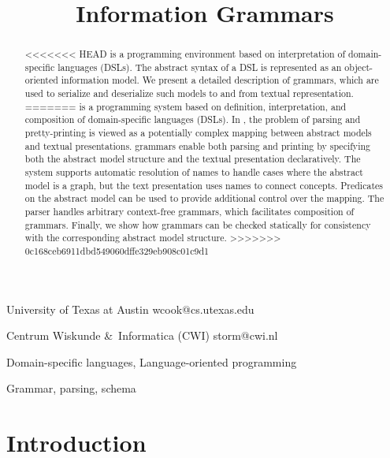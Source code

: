 \documentclass[preprint,10pt]{sigplanconf}
\begin{document}

\title{Information Grammars} %

%
{University of Texas at Austin}%
{wcook@cs.utexas.edu}

%
{Centrum Wiskunde \&\ Informatica (CWI)}%
{storm@cwi.nl}
\maketitle

\begin{abstract}
<<<<<<< HEAD
  \enso is a programming environment based on interpretation of
  domain-specific languages (DSLs). The abstract syntax of a DSL is
  represented as an object-oriented information model. We present a
  detailed description of \enso grammars, which are used to serialize
  and deserialize such models to and from textual representation.
=======
  \enso is a programming system based on definition, interpretation, and composition of
  domain-specific languages (DSLs). In \enso, the problem of parsing and pretty-printing
  is viewed as a potentially complex mapping between abstract models and textual presentations.
  \enso grammars enable both parsing and printing by specifying both the abstract model
  structure and the textual presentation declaratively. The system supports automatic
  resolution of names to handle cases where the abstract model is a graph, but the 
  text presentation uses names to connect concepts. Predicates on the abstract model 
  can be used to provide additional control over the mapping. The \enso parser handles arbitrary
  context-free grammars, which facilitates composition of grammars. 
  Finally, we show how grammars can be checked statically for consistency with the
  corresponding abstract model structure.
>>>>>>> 0c168ceb6911dbd549060dffe329eb908c01c9d1
\end{abstract}


\terms
Domain-specific languages, Language-oriented programming

\keywords
Grammar, parsing, schema


\section{Introduction}
\end{document}
